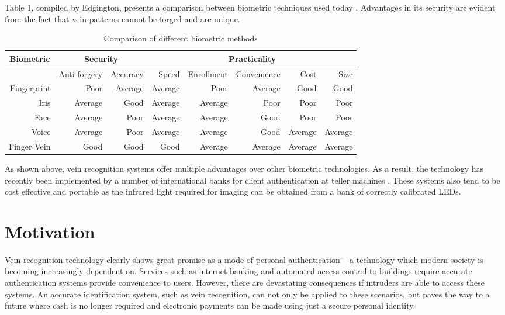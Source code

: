 Table 1, compiled by Edgington, presents a comparison between biometric techniques used today \cite{edginton}. Advantages in its security are evident from the fact that vein patterns cannot be forged and are unique.

\begin{table}[htbp]
  \centering
  \caption{Comparison of different biometric methods}
    \begin{tabular}{rrrrrrrr}
    \toprule
    \multicolumn{1}{c}{\multirow{2}[0]{*}{Biometric}} & \multicolumn{2}{c}{Security} & \multicolumn{5}{c}{Practicality} \\
    \midrule
    \multicolumn{1}{c}{} & Anti-forgery & Accuracy & Speed & Enrollment & Convenience & Cost  & Size \\
    Fingerprint & Poor  & Average & Average & Poor  & Average & Good  & Good \\
    Iris  & Average & Good  & Average & Average & Poor  & Poor  & Poor \\
    Face  & Average & Poor  & Average & Average & Good  & Poor  & Poor \\
    Voice & Average & Poor  & Average & Average & Good  & Average & Average \\
    Finger Vein & Good  & Good  & Good  & Average & Average & Average & Average \\
    \bottomrule
    \end{tabular}%
  \label{tab:addlabel}%
\end{table}%

As shown above, vein recognition systems offer multiple advantages over other biometric technologies. As a result, the technology has recently been implemented by a number of international banks for client authentication at teller machines \cite{Vallabh2012}. These systems also tend to be cost effective and portable as the infrared light required for imaging can be obtained from a bank of correctly calibrated LEDs.

\section{Motivation}
 Vein recognition technology clearly shows great promise as a mode of personal authentication -- a technology which modern society is becoming increasingly dependent on. Services such as internet banking and automated access control to buildings require accurate authentication systems provide convenience to users. However, there are devastating consequences if intruders are able to access these systems. An accurate identification system, such as vein recognition, can not only be applied to these scenarios, but paves the way to a future where cash is no longer required and electronic payments can be made using just a secure personal identity. 

